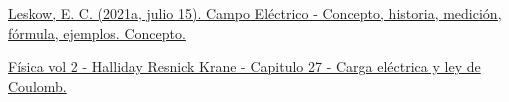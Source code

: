 \begin{thebibliography}{99}

  \href{https://concepto.de/campo-electrico/}{ Leskow, E. C. (2021a, julio 15). Campo Eléctrico - Concepto, historia, medición, fórmula, ejemplos. Concepto.}

  \href{https://www.docsity.com/es/fisica-vol-2-halliday-resnick-krane-capitulo-27-carga-electrica-y-ley-de-coulomb/8247802/}{Física vol 2 - Halliday Resnick Krane - Capitulo 27 - Carga eléctrica y ley de Coulomb.}
  
\end{thebibliography}
